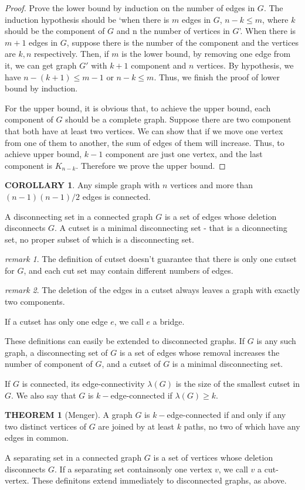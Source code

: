 \documentclass[a4paper,11pt]{article}%
\theoremstyle{remark}
\newtheorem*{remark}{remark}
\theoremstyle{definition}
\newtheorem{theorem}{THEOREM}[section]
\theoremstyle{definition}
\newtheorem{corollary}{COROLLARY}[section]
\theoremstyle{definition}
\theoremstyle{definition}
\theoremstyle{plain}
\theoremstyle{definition}
\begin{document}
\begin{proof}
    Prove the lower bound by induction on the number of edges in $G$.
    The induction hypothesis should be `when there is $m$ edges in $G$, $n-k\leq m$,
    where $k$ should be the component of $G$ and n the number of vertices in $G$'.
    When there is $m+1$ edges in $G$, suppose there is the number of the 
    component and the vertices are $k,n$ respectively. Then,
    if $m$ is the lower bound, by removing one edge from it, we 
    can get graph $G'$ with $k+1$ component and $n$ vertices. By 
    hypothesis, we have $n-(k+1)\leq m-1$ or $n-k\leq m$. Thus, we finish the 
    proof of lower bound by induction.

For the upper bound, it is obvious that, to achieve the upper bound, 
each component of $G$ should be a complete graph. Suppose there are 
two component that both have at least two vertices. We can show that 
if we move one vertex from one of them to another, the sum of 
edges of them will increase. Thus, to achieve upper bound, $k-1$ component
are just one vertex, and the last component is $K_{n-k}$. Therefore we prove 
the upper bound.
\end{proof}
\begin{corollary}
    Any simple graph with $n$ vertices and more than $(n-1)(n-1)/2$ edges 
    is connected.
\end{corollary}
A disconnecting set in a connected graph $G$ is a set of edges whose deletion 
disconnects $G$. A cutset is a minimal disconnecting set - that is 
a diconnecting set, no proper subset of which is a disconnecting set.
\begin{remark}
    The definition of cutset doesn't guarantee that there is only one 
    cutset for $G$, and each cut set may contain different numbers of 
    edges.
\end{remark}
\begin{remark}
    The deletion of the edges in a cutset always leaves a graph with exactly 
    two components.
\end{remark}
If a cutset has only one edge $e$, we call $e$ a bridge.

These definitions can easily be extended to disconnected graphs.
If $G$ is any such graph, a disconnecting set of $G$ is a set of 
edges whose removal increases the number of component of $G$, and 
a cutset of $G$ is a minimal disconnecting set.

If $G$ is connected, its edge-connectivity $\lambda(G)$
is the size of the smallest cutset in $G$. We also say that $G$
is $k-$edge-connected if $\lambda(G)\geq k$.
\begin{theorem}[Menger]
   A graph $G$ is $k-$edge-connected if and only if any 
   two distinct vertices of $G$ are joined by at least $k$ paths, 
   no two of which have any edges in common. 
\end{theorem}
A separating set in a connected graph $G$ is a set of vertices 
whose deletion disconnects $G$. If a separating set containsonly one vertex 
$v$, we call $v$ a cut-vertex. These definitons extend immediately to disconnected 
graphs, as above.
\end{document}
